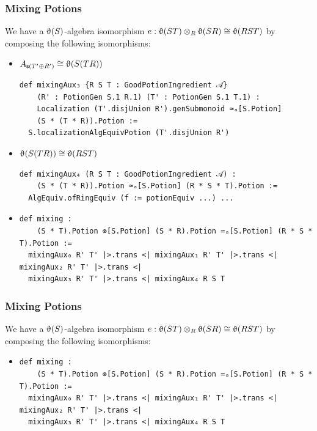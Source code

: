 \documentclass[9pt]{beamer}
\begin{document}
\begin{frame}[fragile]
\frametitle{Mixing Potions}
  We have a $\operatorname{\upvartheta}(S)$-algebra isomorphism $e: \operatorname{\upvartheta}(ST) \otimes_R \operatorname{\upvartheta}(SR) \cong \operatorname{\upvartheta}(RST)$ by 
  composing the following isomorphisms:
\begin{itemize}
  \item $A_{\mathsf{s}(T'\oplus R')} \cong \operatorname{\upvartheta}(S(TR))$
    \begin{lstlisting}
def mixingAux₃ {R S T : GoodPotionIngredient 𝒜}
    (R' : PotionGen S.1 R.1) (T' : PotionGen S.1 T.1) :
    Localization (T'.disjUnion R').genSubmonoid ≃ₐ[S.Potion]
    (S * (T * R)).Potion :=
  S.localizationAlgEquivPotion (T'.disjUnion R')
  \end{lstlisting}

  \item $\operatorname{\upvartheta}(S(TR)) \cong \operatorname{\upvartheta}(RST)$
  \begin{lstlisting}
def mixingAux₄ (R S T : GoodPotionIngredient 𝒜) :
    (S * (T * R)).Potion ≃ₐ[S.Potion] (R * S * T).Potion :=
  AlgEquiv.ofRingEquiv (f := potionEquiv ...) ...
  \end{lstlisting}

\item   \begin{lstlisting}[]
def mixing : 
    (S * T).Potion ⊗[S.Potion] (S * R).Potion ≃ₐ[S.Potion] (R * S * T).Potion :=
  mixingAux₀ R' T' |>.trans <| mixingAux₁ R' T' |>.trans <| mixingAux₂ R' T' |>.trans <|
  mixingAux₃ R' T' |>.trans <| mixingAux₄ R S T
  \end{lstlisting}
\end{itemize}
\end{frame}


\begin{frame}[fragile]
\frametitle{Mixing Potions}
  We have a $\operatorname{\upvartheta}(S)$-algebra isomorphism $e: \operatorname{\upvartheta}(ST) \otimes_R \operatorname{\upvartheta}(SR) \cong \operatorname{\upvartheta}(RST)$ by 
  composing the following isomorphisms:
\begin{itemize}
\item   \begin{lstlisting}[]
def mixing : 
    (S * T).Potion ⊗[S.Potion] (S * R).Potion ≃ₐ[S.Potion] (R * S * T).Potion :=
  mixingAux₀ R' T' |>.trans <| mixingAux₁ R' T' |>.trans <| mixingAux₂ R' T' |>.trans <|
  mixingAux₃ R' T' |>.trans <| mixingAux₄ R S T
  \end{lstlisting}
\end{itemize}
\end{frame}
\end{document}
